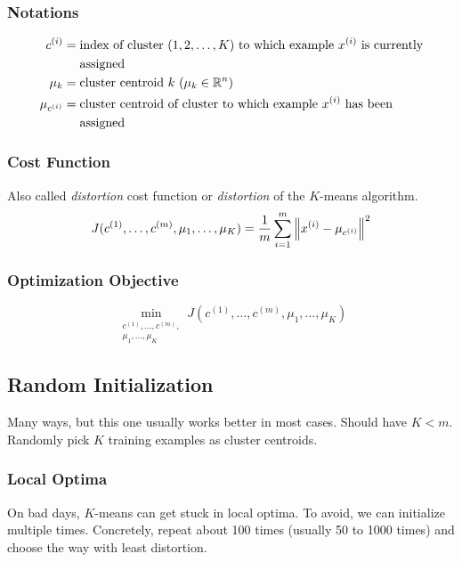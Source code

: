 \subsubsection{Notations}
\begin{align*}
	c^{(i)}       & = \text{index of cluster } (1, 2, \dots, K) \text{ to which example }
	x^{(i)} \text{ is currently}                                                          \\
	              & \ \ \ \ \text{assigned}                                               \\
	\mu_k         & = \text{cluster centroid } k\  (\mu_k \in \R^n)                       \\
	\mu_{c^{(i)}} & = \text{cluster centroid of cluster to which example } x^{(i)}
	\text{ has been }                                                                     \\
	              & \ \ \ \ \text{assigned}                                               \\
\end{align*}

\subsubsection{Cost Function}
Also called \emph{distortion} cost function or
\emph{distortion} of the $K$-means algorithm.
\begin{equation*}
	J(c^{(1)}, \dots, c^{(m)}, \mu_1, \dots, \mu_K) =
	\frac{1}{m} \sum_{i=1}^m \left\Vert x^{(i)} - \mu_{c^{(i)}} \right\Vert^2
\end{equation*}

\subsubsection{Optimization Objective}
\begin{equation*}
	\min_{\substack{c^{(1)}, \dots, c^{(m)},\\ \mu_1, \dots, \mu_K}}
	J(c^{(1)}, \dots, c^{(m)}, \mu_1, \dots, \mu_K)
\end{equation*}

\subsection{Random Initialization}
Many ways, but this one usually works better in most cases.
Should have $K < m$. Randomly pick $K$ training examples as
cluster centroids.

\subsubsection{Local Optima}
On bad days, $K$-means can get stuck in local optima. To avoid, we can initialize
multiple times. Concretely, repeat about 100 times (usually 50 to 1000 times) and
choose the way with least distortion.

